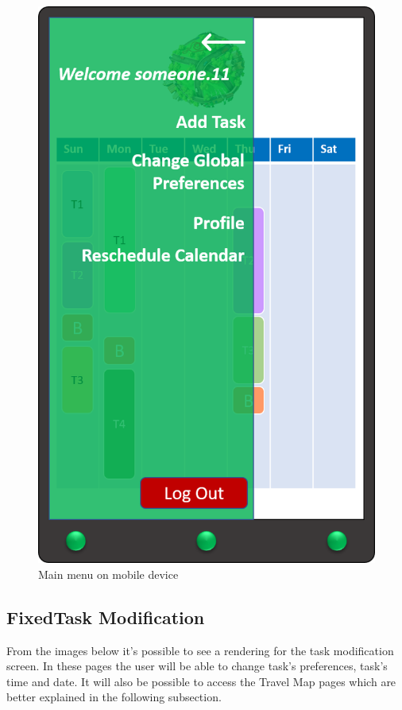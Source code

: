 \begin{figure}[H]
    \centering
    \includegraphics[scale=0.3]{Pictures/Mockups/AppMenu.png}
    \caption{Main menu on mobile device}
\end{figure}

\subsection*{FixedTask Modification}
From the images below it's possible to see a rendering for the task modification screen. In these pages the user will be able to change task's preferences, task's time and date. It will also be possible to access the Travel Map pages which are better explained in the following subsection.

